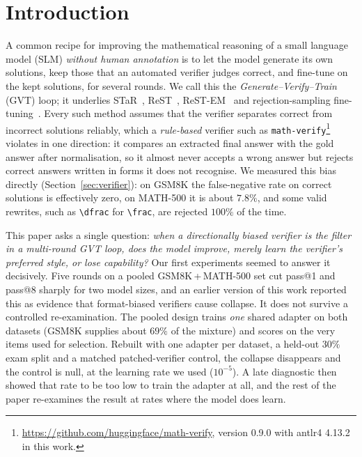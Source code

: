 \documentclass[runningheads]{llncs}
\begin{document}
\section{Introduction}
\label{sec:intro}

A common recipe for improving the mathematical reasoning of a small language
model (SLM) \emph{without human annotation} is to let the model generate its own
solutions, keep those that an automated verifier judges correct, and fine-tune
on the kept solutions, for several rounds. We call this the
\emph{Generate--Verify--Train} (GVT) loop; it underlies STaR~\cite{ref_star},
ReST~\cite{ref_rest}, ReST-EM~\cite{ref_restem} and rejection-sampling
fine-tuning~\cite{ref_rft}. Every such method assumes that the verifier separates
correct from incorrect solutions reliably, which a \emph{rule-based} verifier
such as \texttt{math-verify}\footnote{\url{https://github.com/huggingface/math-verify},
version 0.9.0 with antlr4 4.13.2 in this work.} violates in one direction: it
compares an extracted final answer with the gold answer after normalisation, so
it almost never accepts a wrong answer but rejects correct answers written in
forms it does not recognise. We measured this bias directly
(Section~\ref{sec:verifier}): on GSM8K the false-negative rate on correct
solutions is effectively zero, on MATH-500 it is about $7.8\%$, and some valid
rewrites, such as \verb|\dfrac| for \verb|\frac|, are rejected $100\%$ of the time.

This paper asks a single question: \emph{when a directionally biased verifier is
the filter in a multi-round GVT loop, does the model improve, merely learn the
verifier's preferred style, or lose capability?} Our first experiments seemed to
answer it decisively. Five rounds on a pooled GSM8K\,+\,MATH-500 set cut pass@1
and pass@8 sharply for two model sizes, and an earlier version of this work
reported this as evidence that format-biased verifiers cause collapse. It does
not survive a controlled re-examination. The pooled design trains \emph{one}
shared adapter on both datasets (GSM8K supplies about $69\%$ of the mixture) and
scores on the very items used for selection. Rebuilt with one adapter per
dataset, a held-out $30\%$ exam split and a matched patched-verifier control, the
collapse disappears and the control is null, at the learning rate we used
($10^{-5}$). A late diagnostic then showed that rate to be too low to train the
adapter at all, and the rest of the paper re-examines the result at rates where
the model does learn.
\end{document}
